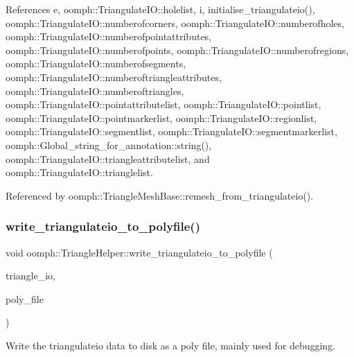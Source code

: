 References e, oomph\+::\+Triangulate\+I\+O\+::holelist, i, initialise\+\_\+triangulateio(), oomph\+::\+Triangulate\+I\+O\+::numberofcorners, oomph\+::\+Triangulate\+I\+O\+::numberofholes, oomph\+::\+Triangulate\+I\+O\+::numberofpointattributes, oomph\+::\+Triangulate\+I\+O\+::numberofpoints, oomph\+::\+Triangulate\+I\+O\+::numberofregions, oomph\+::\+Triangulate\+I\+O\+::numberofsegments, oomph\+::\+Triangulate\+I\+O\+::numberoftriangleattributes, oomph\+::\+Triangulate\+I\+O\+::numberoftriangles, oomph\+::\+Triangulate\+I\+O\+::pointattributelist, oomph\+::\+Triangulate\+I\+O\+::pointlist, oomph\+::\+Triangulate\+I\+O\+::pointmarkerlist, oomph\+::\+Triangulate\+I\+O\+::regionlist, oomph\+::\+Triangulate\+I\+O\+::segmentlist, oomph\+::\+Triangulate\+I\+O\+::segmentmarkerlist, oomph\+::\+Global\+\_\+string\+\_\+for\+\_\+annotation\+::string(), oomph\+::\+Triangulate\+I\+O\+::triangleattributelist, and oomph\+::\+Triangulate\+I\+O\+::trianglelist.



Referenced by oomph\+::\+Triangle\+Mesh\+Base\+::remesh\+\_\+from\+\_\+triangulateio().

\mbox{\label{namespaceoomph_1_1TriangleHelper_aac66d74842d8c3600be11d2845f4e4a5}} 
\subsubsection{\texorpdfstring{write\+\_\+triangulateio\+\_\+to\+\_\+polyfile()}{write\_triangulateio\_to\_polyfile()}}
{\footnotesize\ttfamily void oomph\+::\+Triangle\+Helper\+::write\+\_\+triangulateio\+\_\+to\+\_\+polyfile (\begin{DoxyParamCaption}\item[{\hyperlink{structoomph_1_1TriangulateIO}{Triangulate\+IO} \&}]{triangle\+\_\+io,  }\item[{std\+::ostream \&}]{poly\+\_\+file }\end{DoxyParamCaption})}



Write the triangulateio data to disk as a poly file, mainly used for debugging. 




